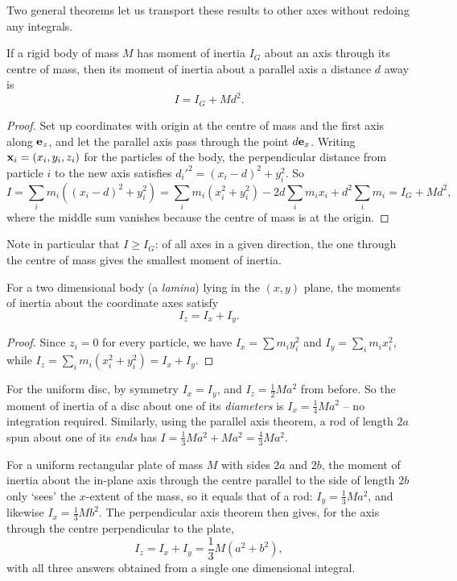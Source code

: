 \documentclass[a4paper]{scrartcl}
\begin{document}
Two general theorems let us transport these results to other axes without redoing any integrals.

\begin{theorem}
	If a rigid body of mass $M$ has moment of inertia $I_G$ about an axis through its centre of mass, then its moment of inertia about a parallel axis a distance $d$ away is
	$$
	I = I_G + Md^2.
	$$
\end{theorem}
\begin{proof}
	Set up coordinates with origin at the centre of mass and the first axis along $\mathbf{e}_z$, and let the parallel axis pass through the point $d \mathbf{e}_x$. Writing $\mathbf{x}_i = (x_i, y_i, z_i)$ for the particles of the body, the perpendicular distance from particle $i$ to the new axis satisfies $d_i'^2 = (x_i - d)^2 + y_i^2$. So
	$$
	I = \sum_i m_i \left((x_i - d)^2 + y_i^2\right) = \sum_i m_i (x_i^2 + y_i^2) - 2d \sum_i m_i x_i + d^2 \sum_i m_i = I_G + Md^2,
	$$
	where the middle sum vanishes because the centre of mass is at the origin.
\end{proof}

Note in particular that $I \geq I_G$: of all axes in a given direction, the one through the centre of mass gives the smallest moment of inertia.

\begin{theorem}
	For a two dimensional body (a \emph{lamina}) lying in the $(x,y)$ plane, the moments of inertia about the coordinate axes satisfy
	$$
	I_z = I_x + I_y.
	$$
\end{theorem}
\begin{proof}
	Since $z_i = 0$ for every particle, we have $I_x = \sum m_i y_i^2$ and $I_y = \sum_i m_i x_i^2$, while $I_z = \sum_i m_i (x_i^2 + y_i^2) = I_x + I_y$.
\end{proof}

\begin{example}
	For the uniform disc, by symmetry $I_x = I_y$, and $I_z = \frac{1}{2}Ma^2$ from before. So the moment of inertia of a disc about one of its \emph{diameters} is $I_x = \frac{1}{4}Ma^2$ -- no integration required. Similarly, using the parallel axis theorem, a rod of length $2a$ spun about one of its \emph{ends} has $I = \frac{1}{3}Ma^2 + Ma^2 = \frac{4}{3}Ma^2$.
\end{example}

\begin{example}
	For a uniform rectangular plate of mass $M$ with sides $2a$ and $2b$, the moment of inertia about the in-plane axis through the centre parallel to the side of length $2b$ only `sees' the $x$-extent of the mass, so it equals that of a rod: $I_y = \frac{1}{3}Ma^2$, and likewise $I_x = \frac{1}{3}Mb^2$. The perpendicular axis theorem then gives, for the axis through the centre perpendicular to the plate,
	$$
	I_z = I_x + I_y = \frac{1}{3}M(a^2 + b^2),
	$$
	with all three answers obtained from a single one dimensional integral.
\end{example}
\end{document}
